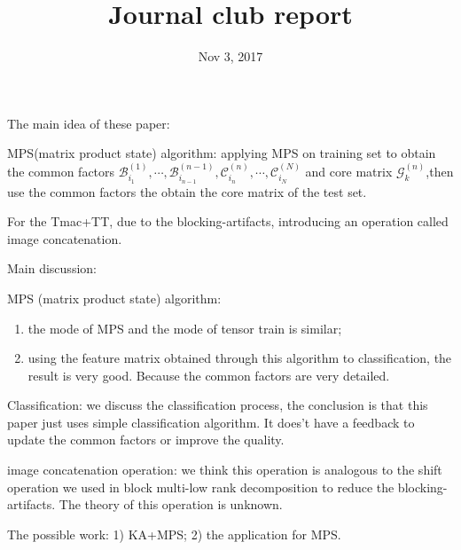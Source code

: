 \documentclass[UTF8]{article}
\begin{document}
	\title{Journal club report}	
	\date{Nov 3, 2017} 
	\maketitle
	The main idea of these paper:
	
	MPS(matrix product state) algorithm: applying MPS on training set to obtain the common  factors $\mathcal{B}_{i_1}^{(1)},\cdots,\mathcal{B}_{i_{n-1}}^{(n-1)}  ,\mathcal{C}_{i_n}^{(n)},\cdots,\mathcal{C}_{i_N}^{(N)}$  and core matrix $\mathcal{G}_k^{(n)}$,then use the common factors the obtain the core matrix of the test set.
	
	For the Tmac+TT, due to the blocking-artifacts, introducing an operation called image concatenation.
	
	Main discussion:
	
	MPS (matrix product state) algorithm:  
	\begin{enumerate}[1)]
	\item the mode of MPS and the mode of tensor train is similar; 
	\item using the feature matrix obtained through this algorithm to classification, the result is very good. Because the common factors are very detailed.
     \end{enumerate}
 
	Classification: we discuss the classification process, the conclusion is that this paper just uses simple classification algorithm. It does’t have a feedback to update the common factors or improve the quality.
	
	image concatenation operation: we think this operation is analogous to the shift operation we used in block multi-low rank decomposition to reduce the blocking-artifacts. The theory of this operation is unknown.
	
	The possible work: 1) KA+MPS; 2) the application for MPS.

 
    		
\end{document}
